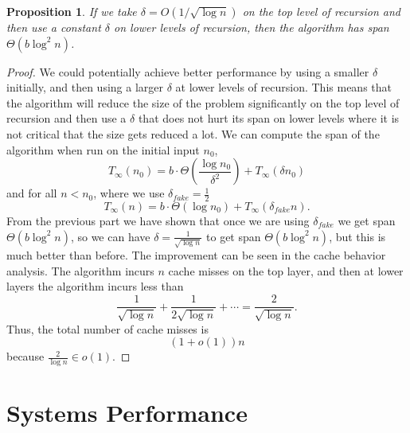 \documentclass[twocolumn, twoside, 12pt]{article}
\newtheorem{proposition}{Proposition}
\begin{document}
\begin{proposition}
	If we take $\delta = O(1 / \sqrt{\log n})$ on the top level of recursion and then use a constant $\delta$ on lower levels of recursion, then the algorithm has span $\Theta(b\log^2 n)$.
\end{proposition}
\begin{proof}
We could potentially achieve better performance by using a smaller $\delta$ initially, and then using a larger $\delta$ at lower levels of recursion.
This means that the algorithm will reduce the size of the problem significantly on the top level of recursion and then use a $\delta$ that does not hurt its span on lower levels where it is not critical that the size gets reduced a lot.
We can compute the span of the algorithm when run on the initial input $n_0$,
$$T_\infty(n_0) = b\cdot \Theta(\frac{\log n_0}{\delta ^2})+T_\infty(\delta n_0)$$
and for all $n<n_0$, where we use $\delta_{fake} = \frac{1}{2}$
$$T_\infty(n) =  b\cdot \Theta(\log n_0)+T_\infty(\delta_{fake} n).$$
From the previous part we have shown that once we are using $\delta_{fake}$ we get span $\Theta(b\log^2 n)$, so we can have $\delta = \frac{1}{\sqrt{\log n}}$ to get span $\Theta(b\log^2 n)$, but this is much better than before. 
The improvement can be seen in the cache behavior analysis.
The algorithm incurs $n$ cache misses on the top layer, and then at lower layers the algorithm incurs less than
	$$\frac{1}{\sqrt{\log n}} + \frac{1}{2\sqrt{\log n}} + \cdots = \frac{2}{\sqrt{\log n}}.$$
	Thus, the total number of cache misses is $$(1+o(1))n$$ because $\frac{2}{\log n} \in o(1)$.

\end{proof}
	
	
\section{Systems Performance}
\end{document}
